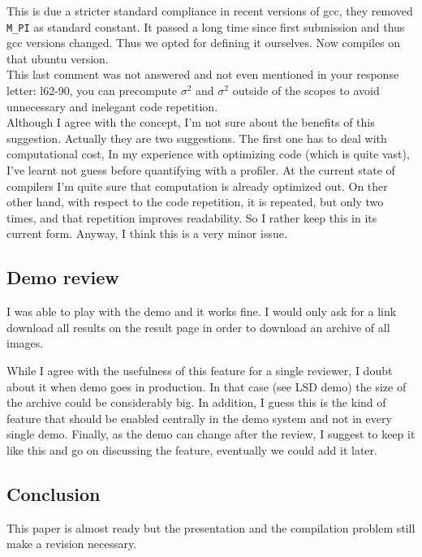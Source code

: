 \documentclass[a4paper,10pt]{report}
\begin{document}
\ans This is due a stricter standard compliance in recent versions of gcc, they removed \verb+M_PI+ as standard constant. It passed a long time since first submission and thus gcc versions changed. Thus we opted for defining it ourselves. Now compiles on that ubuntu version.\\

\que This last comment was not answered and not even mentioned in your response letter:
l62-90, you can precompute $\sigma^2$ and $\sigma^2$ outside of the scopes to avoid unnecessary and inelegant code
repetition.\\

\ans  Although I agree with the concept, I'm not sure about the benefits of this suggestion. Actually they are two suggestions. The first one has to deal with computational cost, In my experience with optimizing code (which is quite vast), I've learnt not guess before quantifying with a profiler. At the current state of compilers I'm quite sure that computation is already optimized out. On ther other hand, with respect to the code repetition, it is repeated, but only two times, and that repetition improves readability. So I rather keep this in its current form. Anyway, I think this is a very minor issue.\\

\subsection{ Demo review}
\que I was able to play with the demo and it works fine. I would only ask for a link download all results on the
result page in order to download an archive of all images.

\ans While I agree with the usefulness of this feature for a single reviewer, I doubt about it when demo goes in production. In that case (see LSD demo) the size of the archive could be considerably big. In addition, I guess this is the kind of feature that should be enabled centrally in the demo system and not in every single demo. Finally, as the demo can change after the review, I suggest to keep it like this and go on discussing the feature, eventually we could add it later.\\

\subsection{ Conclusion}
This paper is almost ready but the presentation and the compilation problem still make a revision necessary.
\end{document}
